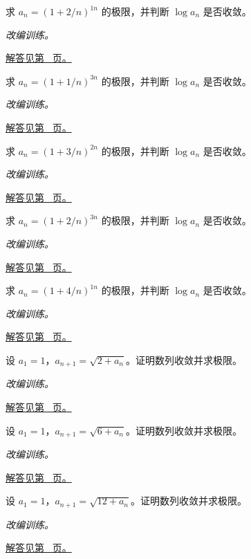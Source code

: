 \documentclass[12pt,fontset=fandol]{ctexart}
\begin{document}
\begin{example}[指数型数列]\label{ex:c1q14}
求 $a_n=(1+2/n)^{1n}$ 的极限，并判断 $\log a_n$ 是否收敛。
\par\textit{改编训练。}\par\hyperref[ans:c1q14]{解答见第~\pageref{ans:c1q14} 页。}
\end{example}
\begin{example}[指数型数列]\label{ex:c1q15}
求 $a_n=(1+1/n)^{3n}$ 的极限，并判断 $\log a_n$ 是否收敛。
\par\textit{改编训练。}\par\hyperref[ans:c1q15]{解答见第~\pageref{ans:c1q15} 页。}
\end{example}
\begin{example}[指数型数列]\label{ex:c1q16}
求 $a_n=(1+3/n)^{2n}$ 的极限，并判断 $\log a_n$ 是否收敛。
\par\textit{改编训练。}\par\hyperref[ans:c1q16]{解答见第~\pageref{ans:c1q16} 页。}
\end{example}
\begin{example}[指数型数列]\label{ex:c1q17}
求 $a_n=(1+2/n)^{3n}$ 的极限，并判断 $\log a_n$ 是否收敛。
\par\textit{改编训练。}\par\hyperref[ans:c1q17]{解答见第~\pageref{ans:c1q17} 页。}
\end{example}
\begin{example}[指数型数列]\label{ex:c1q18}
求 $a_n=(1+4/n)^{1n}$ 的极限，并判断 $\log a_n$ 是否收敛。
\par\textit{改编训练。}\par\hyperref[ans:c1q18]{解答见第~\pageref{ans:c1q18} 页。}
\end{example}
\begin{example}[根式递推与单调有界]\label{ex:c1q19}
设 $a_1=1$，$a_{n+1}=\sqrt{2+a_n}$。证明数列收敛并求极限。
\par\textit{改编训练。}\par\hyperref[ans:c1q19]{解答见第~\pageref{ans:c1q19} 页。}
\end{example}
\begin{example}[根式递推与单调有界]\label{ex:c1q20}
设 $a_1=1$，$a_{n+1}=\sqrt{6+a_n}$。证明数列收敛并求极限。
\par\textit{改编训练。}\par\hyperref[ans:c1q20]{解答见第~\pageref{ans:c1q20} 页。}
\end{example}
\begin{example}[根式递推与单调有界]\label{ex:c1q21}
设 $a_1=1$，$a_{n+1}=\sqrt{12+a_n}$。证明数列收敛并求极限。
\par\textit{改编训练。}\par\hyperref[ans:c1q21]{解答见第~\pageref{ans:c1q21} 页。}
\end{example}
\end{document}
